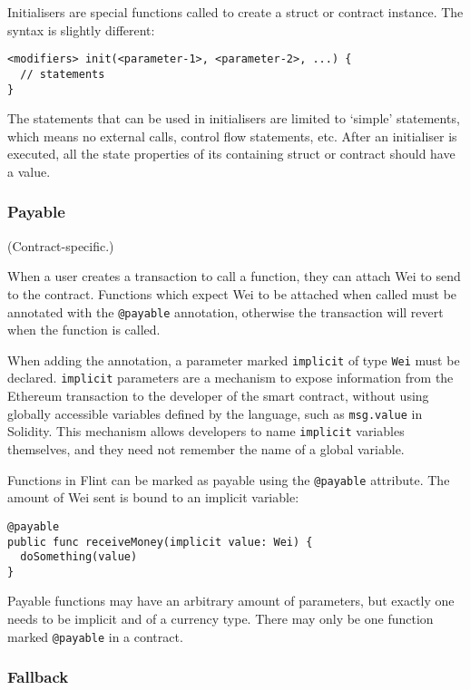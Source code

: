 Initialisers are special functions called to create a struct or contract instance. The syntax is slightly different:

\begin{verbatim}
<modifiers> init(<parameter-1>, <parameter-2>, ...) {
  // statements
}
\end{verbatim}

The statements that can be used in initialisers are limited to `simple' statements, which means no external calls, control flow statements, etc. After an initialiser is executed, all the state properties of its containing struct or contract should have a value.

\subsubsection{Payable}
\label{sec:appendix-b-payable}

(Contract-specific.)

When a user creates a transaction to call a function, they can attach Wei to send to the contract. Functions which expect Wei to be attached when called must be annotated with the \texttt{@payable} annotation, otherwise the transaction will revert when the function is called.

When adding the annotation, a parameter marked \texttt{implicit} of type \texttt{Wei} must be declared. \texttt{implicit} parameters are a mechanism to expose information from the Ethereum transaction to the developer of the smart contract, without using globally accessible variables defined by the language, such as \texttt{msg.value} in Solidity. This mechanism allows developers to name \texttt{implicit} variables themselves, and they need not remember the name of a global variable.

Functions in Flint can be marked as payable using the \texttt{@payable} attribute. The amount of Wei sent is bound to an implicit variable:

\begin{verbatim}
@payable
public func receiveMoney(implicit value: Wei) {
  doSomething(value)
}
\end{verbatim}

Payable functions may have an arbitrary amount of parameters, but exactly one needs to be implicit and of a currency type. There may only be one function marked \texttt{@payable} in a contract.

\subsubsection{Fallback}
\label{sec:appendix-b-fallback}

